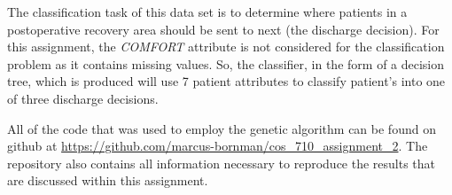 The classification task of this data set is to determine where patients in a postoperative recovery area should be sent to next (the discharge decision). For this assignment, the \emph{COMFORT} attribute is not considered for the classification problem as it contains missing values. So, the classifier, in the form of a decision tree, which is produced will use 7 patient attributes to classify patient's into one of three discharge decisions.

All of the code that was used to employ the genetic algorithm can be found on github at \url{https://github.com/marcus-bornman/cos_710_assignment_2}. The repository also contains all information necessary to reproduce the results that are discussed within this assignment.
